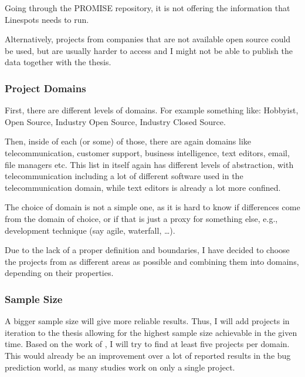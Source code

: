 Going through the PROMISE repository, it is not offering the information that Linespots needs to run. %

Alternatively, projects from companies that are not available open source could be used, but are usually harder to access and I might not be able to publish the data together with the thesis.


\subsubsection{Project Domains}

First, there are different levels of domains. For example something like:
Hobbyist, Open Source, Industry Open Source, Industry Closed Source. 

Then, inside of each (or some) of those, there are again domains like telecommunication, customer support, business intelligence, text editors, email, file managers etc. %
This list in itself again has different levels of abstraction, with telecommunication including a lot of different software used in the telecommunication domain, while text editors is already a lot more confined. %

The choice of domain is not a simple one, as it is hard to know if differences come from the domain of choice, or if that is just a proxy for something else, e.g., development technique (say agile, waterfall, \ldots).

Due to the lack of a proper definition and boundaries, I have decided to choose the projects from as different areas as possible and combining them into domains, depending on their properties. %

\subsubsection{Sample Size}

A bigger sample size will give more reliable results. Thus, I will add projects in iteration to the thesis allowing for the highest sample size achievable in the given time.
 Based on the work of \textcite{5463279}, I will try to find at least five projects per domain. This would already be an improvement over a lot of reported results in the bug prediction world, as many studies work on only a single project. %


